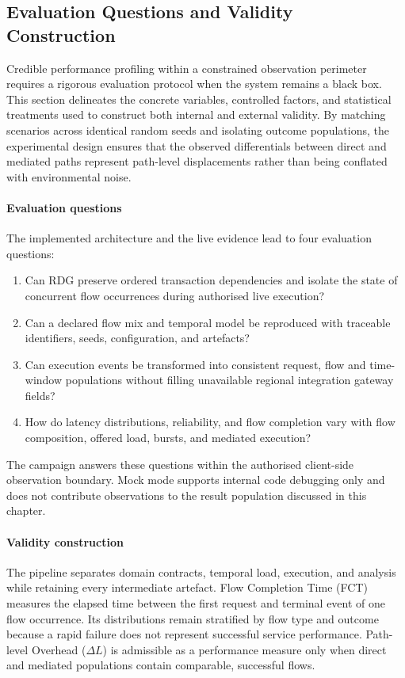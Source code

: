 \subsection{Evaluation Questions and Validity Construction}
\label{subsec:rdg-questions-validity}
\noindent Credible performance profiling within a constrained observation perimeter
requires a rigorous evaluation protocol when the system remains a black box.
This section delineates the concrete variables, controlled factors, and
statistical treatments used to construct both internal and external validity.
By matching scenarios across identical random seeds and isolating outcome
populations, the experimental design ensures that the observed differentials
between direct and mediated paths represent path-level displacements rather
than being conflated with environmental noise.
\paragraph{Evaluation questions}
\noindent The implemented architecture and the live evidence lead to four
evaluation questions:
\begin{enumerate}
    \item Can RDG preserve ordered transaction dependencies and isolate the
    state of concurrent flow occurrences during authorised live execution?
    \item Can a declared flow mix and temporal model be reproduced with
    traceable identifiers, seeds, configuration, and artefacts?
    \item Can execution events be transformed into consistent request, flow
    and time-window populations without filling unavailable
    regional integration gateway fields?
    \item How do latency distributions, reliability, and flow completion vary
    with flow composition, offered load, bursts, and mediated execution?
\end{enumerate}
\noindent The campaign answers these questions within the authorised client-side
observation boundary. Mock mode supports internal code debugging only and does
not contribute observations to the result population discussed in this
chapter.

\paragraph{Validity construction}
\noindent The pipeline separates domain contracts, temporal load, execution, and
analysis while retaining every intermediate artefact. Flow Completion Time
(FCT) measures the elapsed time between the first request and terminal event of
one flow occurrence. Its distributions remain stratified by flow type and
outcome because a rapid failure does not represent successful service
performance. Path-level Overhead ($\Delta L$) is admissible as a performance
measure only when direct and mediated populations contain comparable,
successful flows.

